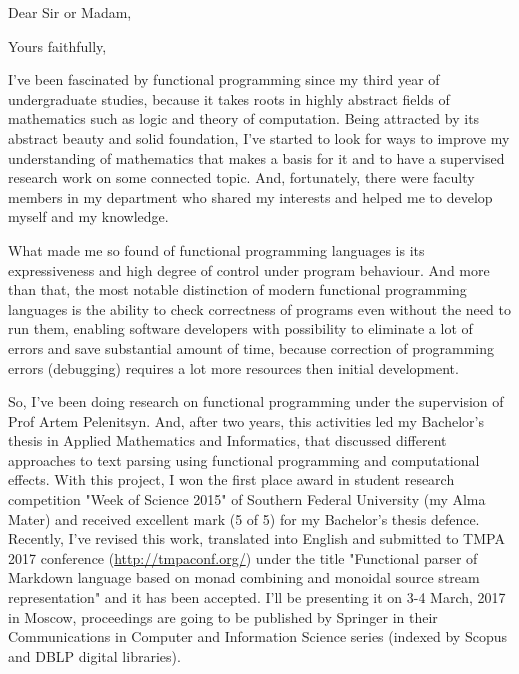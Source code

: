 \documentclass[11pt,a4paper,roman]{moderncv} %
\begin{document}


\clearpage

\recipient{\ }{\ } %
\date{\today} %
\opening{Dear Sir or Madam,} %
\closing{Yours faithfully,} %

\makelettertitle %
\pagestyle{empty}


\justify
I've been fascinated by functional programming since my third year of
undergraduate studies, because it takes roots in highly abstract fields of 
mathematics such as logic and theory of computation. Being attracted 
by its abstract beauty and solid foundation,
I've started to look for ways to improve my understanding of mathematics that 
makes a basis for it and to have a supervised research work on some connected 
topic. And, fortunately, there were faculty members in my department who shared 
my interests and helped me to develop myself and my knowledge.

What made me so found of functional programming languages is its expressiveness
and high degree of control under program behaviour. And more than that,
the most notable distinction of modern functional programming languages is the
ability to check correctness of programs even without the need to run them,
enabling software developers with possibility to eliminate a lot of errors and
save substantial amount of time, because correction of programming errors
(debugging) requires a lot more resources then initial development.

So, I've been doing research on functional programming under the supervision of
Prof Artem Pelenitsyn. And, after two years, this activities led 
my Bachelor's thesis in Applied Mathematics and Informatics, that discussed
different approaches to text parsing using functional programming and 
computational effects. 
With this project, I won the first place award in student research competition
"Week of Science 2015" of Southern Federal University (my Alma Mater) and
received excellent mark (5 of 5) for my Bachelor's thesis defence. 
Recently, I've revised this work, translated into English and submitted to 
TMPA 2017 conference (\url{http://tmpaconf.org/}) under the title "Functional 
parser of Markdown language based on monad combining and monoidal source stream 
representation" and it has been accepted. I'll be presenting it on 3-4
March, 2017 in Moscow, proceedings are going to be published by Springer in
their Communications in Computer and Information Science series (indexed by 
Scopus and DBLP digital libraries). 
\end{document}
